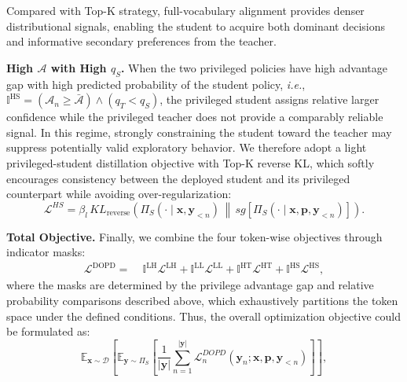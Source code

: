 \documentclass[]{jingdong}
\theoremstyle{plain}
\theoremstyle{definition}
\theoremstyle{remark}
\begin{document}
Compared with Top-K strategy, full-vocabulary alignment provides denser distributional signals, enabling the student to acquire both dominant decisions and informative secondary preferences from the teacher.



\noindent\textbf{High $\mathcal{A}$ with High $q_{S}$.}
When the two privileged policies have high advantage gap with high predicted probability of the student policy, \textit{i.e.}, $\mathbb{I}^{\mathrm{HS}}=\left(\mathcal{A}_{n} \geq \bar{\mathcal{A}} \right)\wedge \left(q_{T} < q_{S}\right)$, the privileged student assigns relative larger confidence while the privileged teacher does not provide a comparably reliable signal. 
In this regime, strongly constraining the student toward the teacher may suppress potentially valid exploratory behavior. 
We therefore adopt a light privileged-student distillation objective with Top-K reverse KL, which softly encourages consistency between the deployed student and its privileged counterpart while avoiding over-regularization:
\begin{equation}
    \mathcal{L}^{HS}
    =
    \beta_{l}\,
    KL_{\mathrm{reverse}}
    \left(
        \Pi_{S}\left(\cdot\mid \mathbf{x},\mathbf{y}_{<n}\right)
        \,\middle\|\,
        sg\left[
        \Pi_{S}\left(\cdot\mid \mathbf{x},\mathbf{p},\mathbf{y}_{<n}\right)
        \right]
    \right).
\end{equation}


\noindent\textbf{Total Objective.}
Finally, we combine the four token-wise objectives through indicator masks:
\begin{equation}
\begin{aligned}
    \mathcal{L}^{\mathrm{DOPD}}
    =&\;
    \mathbb{I}^{\mathrm{LH}}\mathcal{L}^{\mathrm{LH}}
    +
    \mathbb{I}^{\mathrm{LL}}\mathcal{L}^{\mathrm{LL}}
    +
    \mathbb{I}^{\mathrm{HT}}\mathcal{L}^{\mathrm{HT}}
    +
    \mathbb{I}^{\mathrm{HS}}\mathcal{L}^{\mathrm{HS}},
\end{aligned}
\end{equation}
where the masks are determined by the privilege advantage gap and relative probability comparisons described above, which exhaustively partitions the token space under the defined conditions. Thus, the overall optimization objective could be formulated as:
\begin{equation}
    \mathbb{E}_{\mathbf{x} \sim \mathcal{D}}\left[\mathbb{E}_{\mathbf{y} \sim \Pi_{S}}\left[\frac{1}{|\mathbf{y}|} \sum_{n=1}^{|\mathbf{y}|} \mathcal{L}_{n}^{DOPD}\left(\mathbf{y}_{n} ; \mathbf{x}, \mathbf{p}, \mathbf{y}_{<n}\right)\right]\right],
\end{equation}
\end{document}
